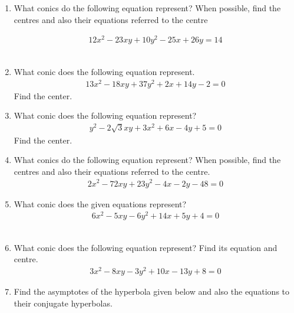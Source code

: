 \renewcommand{\theequation}{\theenumi}
\renewcommand{\thefigure}{\theenumi}
\begin{enumerate}[label=\thesubsection.\arabic*.,ref=\thesubsection.\theenumi]
%
\item What conics do the following equation represent? When possible, find the centres and also their equations referred to the centre

\begin{align}
12x^2-23xy+10y^2-25x+26y=14\label{eq:solutions/40/1/ques}
\end{align}
\\
\solution

\item What conic does the following equation represent. 
\begin{align}
13x^2-18xy+37y^2+2x+14y-2 = 0
\end{align}
Find the center.
\\
\solution

%
\item What conic does the following equation represent?
\begin{align}
y^2-2\sqrt{3}xy+3x^2+6x-4y+5 = 0
\end{align}
Find the center.
\\
\solution

\item What conics do the following equation represent? When possible, find the centres and also their equations referred to the centre.
\begin{align}
2x^2-72xy+23y^2-4x-2y-48=0\label{eq:solutions/40/4/ques}
\end{align}
\solution
%
\item What conic does the given equations represent?
\begin{align}
6x^2-5xy-6y^2+14x+5y+4=0
\end{align}
\\
\solution

\item What conic does the following equation represent? Find its equation and centre.
\begin{align*}
	3x^2 - 8xy - 3y^2 + 10x - 13y + 8 =0 
\end{align*}
\solution

%
\item Find the asymptotes of the hyperbola given below and also the equations to their conjugate hyperbolas.\\

\end{enumerate}
